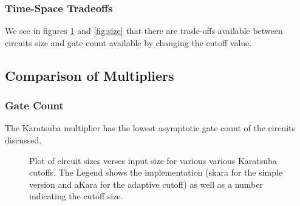    \subsubsection{Time-Space Tradeoffs}
     We see in figures \ref{fig:cutoff} and \ref{fig:size} that there are trade-offs available between circuits size and gate count available by changing the cutoff value.
  \subsection{Comparison of Multipliers}
    \subsubsection{Gate Count}
      The Karatsuba multiplier has the lowest asymptotic gate count of the circuits discussed.
     \begin{figure}[ht]
        \capstart
        \centering
        \caption{Plot of circuit sizes verses input size for various various Karatsuba cutoffs. 
                 The Legend shows the implementation (skara for the simple version and aKara for the adaptive cutoff) as well as a number indicating the cutoff size. }
        \label{fig:cutoff}
      \end{figure}


